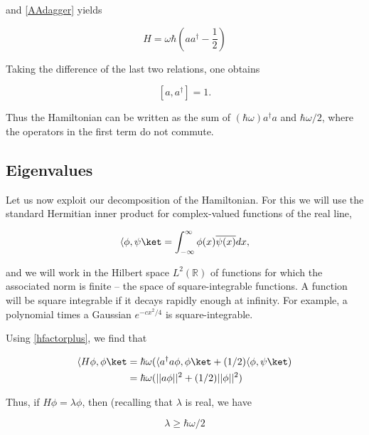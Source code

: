 and \eqref{AAdagger} yields

\begin{equation}
\label{hfactorminus}
H = \omega\hbar\left(a a^\dagger -  \frac{1}{2}\right)
\end{equation}

Taking the difference of the last two relations, one obtains

\begin{equation}
\label{aadaggercommutation}
[a,a^\dagger] = 1.
\end{equation}

Thus the Hamiltonian can be written as the sum of $(\hbar\omega)a^\dagger a$ and $\hbar\omega /2$, where the operators in the first term do not commute.



\subsection{Eigenvalues}

Let us now exploit our decomposition of the Hamiltonian.  For this we will use the standard Hermitian inner product for complex-valued functions of the real line,

\begin{equation}
\bra \phi, \psi \ket  = \int_{-\infty}^{\infty} \phi(x)\overline{\psi(x)} dx,
\end{equation}

and we will work in the Hilbert space $L^2(\mathbb{R})$ of functions for which the associated norm is finite -- the space of square-integrable functions.  A function will be square integrable if it decays rapidly enough at infinity.  For example, a polynomial times a Gaussian $e^{-cx^2/4}$ is square-integrable.



Using
\eqref{hfactorplus}, we find that

\begin{align}
\bra H\phi, \phi\ket 
  &= \hbar\omega(\bra a^\dagger a \phi, \phi \ket + (1/2)\bra \phi, \psi \ket) \\
  &= \hbar \omega(||a\phi||^2 + (1/2)||\phi||^2)
\end{align}

Thus, if $H\phi = \lambda\phi$, then (recalling that $\lambda$ is real, we have

\begin{equation}
\lambda \ge \hbar\omega/2
\end{equation}

